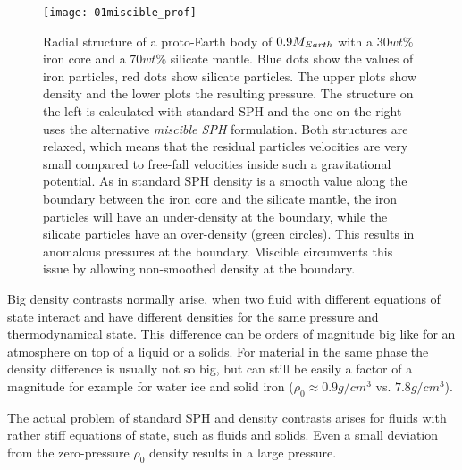 \begin{figure}[htbp]
\begin{center}
\texttt{[image: 01miscible\_prof]}
\caption{Radial structure of a proto-Earth body of $0.9M_{Earth}$ with a $30wt\%$ iron core and a $70wt\%$ silicate mantle. Blue dots show the values of iron particles, red dots show silicate particles. The upper plots show density and the lower plots the resulting pressure. The structure on the left is calculated with standard SPH and the one on the right uses the alternative \emph{miscible SPH} formulation. Both structures are relaxed, which means that the residual particles velocities are very small compared to free-fall velocities inside such a gravitational potential. As in standard SPH density is a smooth value along the boundary between the iron core and the silicate mantle, the iron particles will have an under-density at the boundary, while the silicate particles have an over-density (green circles). This results in anomalous pressures at the boundary. Miscible circumvents this issue by allowing non-smoothed density at the boundary.}
\label{ch02_fig01}
\end{center}
\end{figure}

Big density contrasts normally arise, when two fluid with different equations of state interact and have different densities for the same pressure and thermodynamical state. This difference can be orders of magnitude big like for an atmosphere on top of a liquid or a solids. For material in the same phase the density difference is usually not so big, but can still be easily a factor of a magnitude for example for water ice and solid iron ($\rho_0 \approx 0.9 g/cm^3$ vs. $7.8 g/cm^3$).

The actual problem of standard SPH and density contrasts arises for fluids with rather stiff equations of state, such as fluids and solids. Even a small deviation from the zero-pressure $\rho_0$ density results in a large pressure. 

